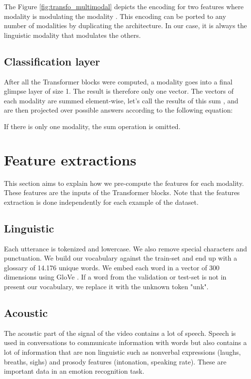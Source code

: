 \documentclass[11pt,a4paper]{article}
\begin{document}
The Figure \ref{fig:transfo_multimodal} depicts the encoding for two features where modality  is modulating the modality . This encoding can be ported to any number of modalities by duplicating the architecture. In our case, it is always the linguistic modality that modulates the others.\\

\subsection{Classification layer}

After all the Transformer blocks were computed, a modality goes into a final glimpse layer of size 1. The result is therefore only one vector. The vectors of each modality are summed element-wise, let's call the results of this sum , and are then projected over possible answers according to the following equation:



If there is only one modality, the sum operation is omitted.

\section{Feature extractions}
\label{sec:feat_ex}
This section aims to explain how we pre-compute the features for each modality. These features are the inputs of the Transformer blocks. Note that the features extraction is done independently for each example of the dataset.

\subsection{Linguistic}
Each utterance is tokenized and lowercase. We also remove special characters and punctuation. We build our vocabulary against the train-set and end up with a glossary of 14.176 unique words. We embed each word in a vector of 300 dimensions using GloVe \cite{pennington2014glove}. If a word from the validation or test-set is not in present our vocabulary, we replace it with the unknown token "unk". 



\subsection{Acoustic}



The acoustic part of the signal of the video contains a  lot of speech. Speech is used in conversations to communicate information with words but also contains a lot of information that are non linguistic such as nonverbal expressions (laughs, breaths, sighs) and prosody features (intonation, speaking rate). These are important data in an emotion recognition task. \\
\end{document}
